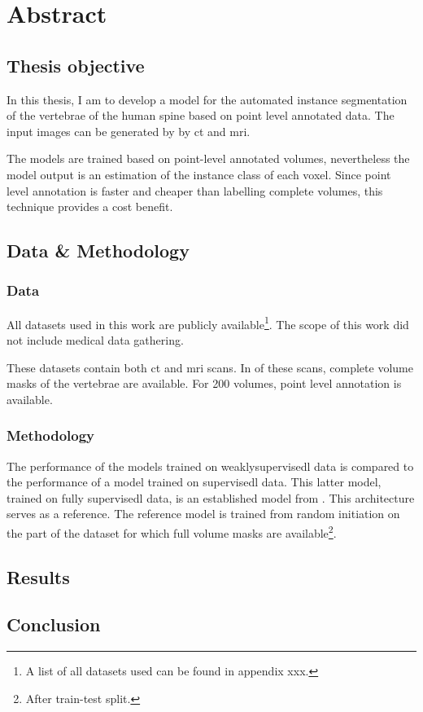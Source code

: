\chapter*{Abstract}
\begin{multicols}{2}
\section*{Thesis objective}
In this thesis, I am to develop a model for the automated instance segmentation of the vertebrae of the human spine based on point level annotated data.
The input images can be generated by by \acrfull{ct} and \acrfull{mri}.


The models are trained based on point-level annotated volumes, nevertheless the model output is an estimation of the instance class of each voxel.
Since point level annotation is faster and cheaper than labelling complete volumes, this technique provides a cost benefit. 

\section*{Data \& Methodology}

\subsection*{Data}
All datasets used in this work are publicly available\footnote{A list of all datasets used can be found in appendix xxx.}. 
The scope of this work did not include medical data gathering.

These datasets contain both \acrshort{ct} and \acrshort{mri} scans. 
In  of these scans, complete volume masks of the vertebrae are available. 
For 200 volumes, point level annotation is available.

\subsection*{Methodology}
The performance of the models trained on \Gls{weaklysupervisedl} data is compared to the performance of a model trained on \Gls{supervisedl} data.
This latter model, trained on fully \Gls{supervisedl} data, is an established model from . 
This architecture serves as a reference.
The reference model is trained from random initiation on the part of the dataset for which full volume masks are available\footnote{After train-test split.}.  

\section*{Results}

\section*{Conclusion}
\end{multicols}